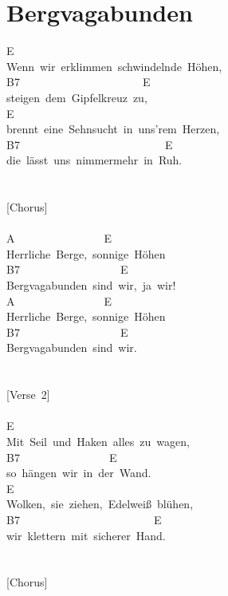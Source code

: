 \documentclass[]{book}
\let\stdsection\section
\renewcommand\section{\clearpage\stdsection}
\begin{document}
\hypertarget{bergvagabunden}{%
\section{Bergvagabunden}\label{bergvagabunden}}

E\\
Wenn~wir~erklimmen~schwindelnde~Höhen,\\
B7~~~~~~~~~~~~~~~~~~~~~~E\\
steigen~dem~Gipfelkreuz~zu,\\
E\\
brennt~eine~Sehnsucht~in~uns'rem~Herzen,\\
B7~~~~~~~~~~~~~~~~~~~~~~~~~~E\\
die~lässt~uns~nimmermehr~in~Ruh.\\
~\\
~\\
{[}Chorus{]}\\
~\\
A~~~~~~~~~~~~~~~~E\\
Herrliche~Berge,~sonnige~Höhen\\
B7~~~~~~~~~~~~~~~~~~E\\
Bergvagabunden~sind~wir,~ja~wir!\\
A~~~~~~~~~~~~~~~~E\\
Herrliche~Berge,~sonnige~Höhen\\
B7~~~~~~~~~~~~~~~~~~E\\
Bergvagabunden~sind~wir.\\
~\\
~\\
{[}Verse~2{]}\\
~\\
E~~~~~~~~\\
Mit~Seil~und~Haken~alles~zu~wagen,\\
\hspace*{0.333em}\hspace*{0.333em}\hspace*{0.333em}B7~~~~~~~~~~~~~~~~E\\
so~hängen~wir~in~der~Wand.\\
E~~~~~~~\\
Wolken,~sie~ziehen,~Edelweiß~blühen,\\
B7~~~~~~~~~~~~~~~~~~~~~~~~E\\
wir~klettern~mit~sicherer~Hand.\\
~\\
~\\
{[}Chorus{]}\\
~\\
\end{document}

